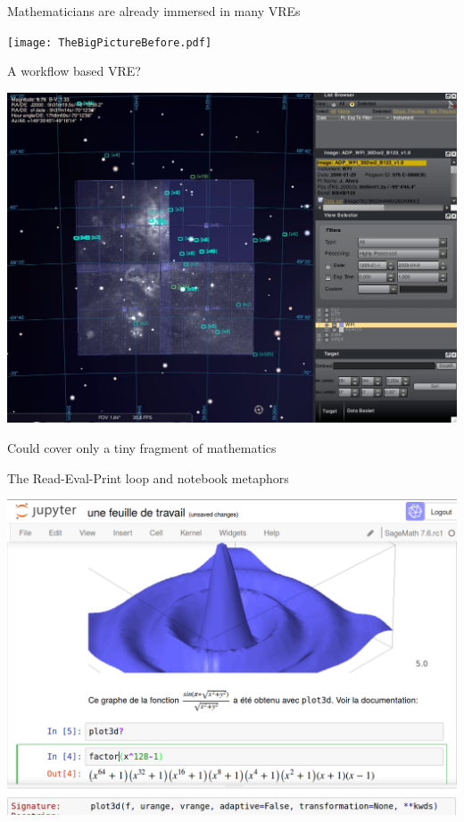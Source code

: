 \documentclass{beamer}
\begin{document}
\begin{frame}{Mathematicians are already immersed in many VREs}
  \begin{bigcenter}
    \texttt{[image: TheBigPictureBefore.pdf]}
  \end{bigcenter}
\end{frame}

\begin{frame}{A workflow based VRE?}
  \centerline{\includegraphics[height=.7\textheight]{virtual_observatory.jpeg}}
  \pause\bigskip

  \centerline{\color{red} Could cover only a tiny fragment of mathematics}
\end{frame}

\begin{frame}{The Read-Eval-Print loop and notebook metaphors}
  \centerline{\includegraphics[height=.8\textheight]{worksheet.png}}
\end{frame}
\end{document}
